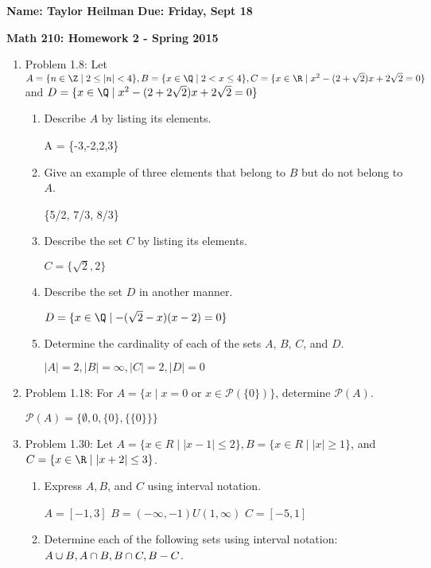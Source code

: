 \documentclass[12pt]{article}
\begin{document}
\textbf{Name: Taylor Heilman}    \hspace{4in} \textbf{Due: Friday, Sept 18}
\begin{center} \textbf{Math 210: Homework 2 - Spring 2015} \end{center}

\begin{enumerate}

\item Problem 1.8: Let $A = \{ n \in \Z \mid 2 \leq |n| < 4 \}, B = \{ x \in \Q \mid 2 < x \leq 4 \}, \newline C = \{ x \in \R \mid x^2-(2 + \sqrt{2})x + 2\sqrt{2} = 0 \}$ and $D = \{ x \in \Q \mid x^2 - (2 + 2\sqrt{2})x + 2\sqrt{2} = 0 \}$
\begin{enumerate}
\item Describe $A$ by listing its elements.

A = \{-3,-2,2,3\}
\item Give an example of three elements that belong to $B$ but do not belong to $A$.

\{5/2, 7/3, 8/3\}
\item Describe the set $C$ by listing its elements.

$C = \{ \sqrt{2}, 2\}$
\item Describe the set $D$ in another manner.

$D = \{ x \in \Q \mid -( \sqrt 2 - x)(x-2)=0\}$

\item Determine the cardinality of each of the sets $A$, $B$, $C$, and $D$.

$ |A| = 2, |B| = \infty , |C| = 2, |D| = 0 $


\end{enumerate}

\item Problem 1.18: For $A = \{ x \mid x = 0$ or $x \in \mathcal{P}(\{ 0 \}) \}$, determine $\mathcal{P}(A)$.

$\mathcal{P}(A) = \{ \emptyset , 0, \{0\} , \{\{0\}\}  \}$


\item Problem 1.30: Let $A = \{ x \in R \mid | x-1 | \leq 2 \}, B = \{ x \in R \mid |x| \geq 1 \}$, and $C = \{ x \in \R \mid |x+2| \leq 3 \}$.
\begin{enumerate}
\item Express $A, B$, and $C$ using interval notation.

$A = [-1,3]$
$B = (- \infty ,-1) U (1, \infty) $
$C = [-5,1]$
\item Determine each of the following sets using interval notation: $A \cup B, A \cap B, \newline B \cap C, B - C$.



\end{enumerate}
\end{enumerate}
\end{document}

